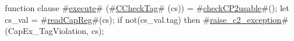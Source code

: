 function clause #\hyperref[zexecute]{execute}# (#\hyperref[zCCheckTag]{CCheckTag}# (cs)) =
{
  #\hyperref[zcheckCP2usable]{checkCP2usable}#();
  let cs_val = #\hyperref[zreadCapReg]{readCapReg}#(cs);
  if not(cs_val.tag) then
    #\hyperref[zraisezyc2zyexception]{raise\_c2\_exception}#(CapEx_TagViolation, cs);
}

